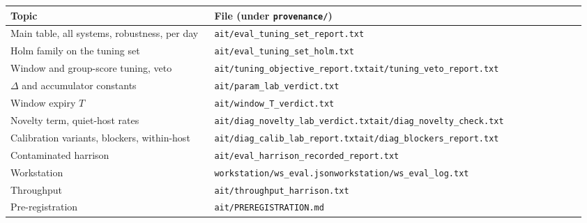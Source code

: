 \documentclass[10.5pt,a4paper]{article}
\begin{document}
\begin{center}\small
\begin{tabular}{@{}p{0.34\linewidth} p{0.62\linewidth}@{}}
\toprule
Topic & File (under \texttt{provenance/}) \\
\midrule
Main table, all systems, robustness, per day & \texttt{ait/eval\_tuning\_set\_report.txt} \\
Holm family on the tuning set & \texttt{ait/eval\_tuning\_set\_holm.txt} \\
Window and group-score tuning, veto & \texttt{ait/tuning\_objective\_report.txt}\newline\texttt{ait/tuning\_veto\_report.txt} \\
$\Delta$ and accumulator constants & \texttt{ait/param\_lab\_verdict.txt} \\
Window expiry $T$ & \texttt{ait/window\_T\_verdict.txt} \\
Novelty term, quiet-host rates & \texttt{ait/diag\_novelty\_lab\_verdict.txt}\newline\texttt{ait/diag\_novelty\_check.txt} \\
Calibration variants, blockers, within-host & \texttt{ait/diag\_calib\_lab\_report.txt}\newline\texttt{ait/diag\_blockers\_report.txt} \\
Contaminated harrison & \texttt{ait/eval\_harrison\_recorded\_report.txt} \\
Workstation & \texttt{workstation/ws\_eval.json}\newline\texttt{workstation/ws\_eval\_log.txt} \\
Throughput & \texttt{ait/throughput\_harrison.txt} \\
Pre-registration & \texttt{ait/PREREGISTRATION.md} \\
\bottomrule
\end{tabular}
\end{center}
\end{document}
